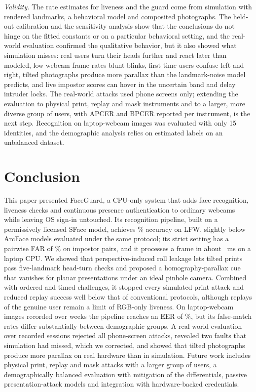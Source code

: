 \documentclass[journal]{IEEEtran}
\newcommand{\sys}{FaceGuard}
\begin{document}
\emph{Validity.} The rate estimates for liveness and the guard come from simulation with rendered landmarks, a behavioral model and composited photographs. The held-out calibration and the sensitivity analysis show that the conclusions do not hinge on the fitted constants or on a particular behavioral setting, and the real-world evaluation confirmed the qualitative behavior, but it also showed what simulation misses: real users turn their heads further and react later than modeled, low webcam frame rates blunt blinks, first-time users confuse left and right, tilted photographs produce more parallax than the landmark-noise model predicts, and live impostor scores can hover in the uncertain band and delay intruder locks. The real-world attacks used phone screens only; extending the evaluation to physical print, replay and mask instruments and to a larger, more diverse group of users, with APCER and BPCER reported per instrument, is the next step. Recognition on laptop-webcam images was evaluated with only 15 identities, and the demographic analysis relies on estimated labels on an unbalanced dataset.

\section{Conclusion}\label{sec:conclusion}
This paper presented \sys{}, a CPU-only system that adds face recognition, liveness checks and continuous presence authentication to ordinary webcams while leaving OS sign-in untouched. Its recognition pipeline, built on a permissively licensed SFace model, achieves \lfwAccFull\% accuracy on LFW, slightly below ArcFace models evaluated under the same protocol; its strict setting has a pairwise FAR of \farStrict\% on \opImpostor{} impostor pairs, and it processes a frame in about \rtPipe~ms on a laptop CPU. We showed that perspective-induced roll leakage lets tilted prints pass five-landmark head-turn checks and proposed a homography-parallax cue that vanishes for planar presentations under an ideal pinhole camera. Combined with ordered and timed challenges, it stopped every simulated print attack and reduced replay success well below that of conventional protocols, although replays of the genuine user remain a limit of RGB-only liveness. On laptop-webcam images recorded over weeks the pipeline reaches an EER of \mpEer\%, but its false-match rates differ substantially between demographic groups. A real-world evaluation over \rwAllSessions{} recorded sessions rejected all \rwAllAttN{} phone-screen attacks, revealed two faults that simulation had missed, which we corrected, and showed that tilted photographs produce more parallax on real hardware than in simulation. Future work includes physical print, replay and mask attacks with a larger group of users, a demographically balanced evaluation with mitigation of the differentials, passive presentation-attack models and integration with hardware-backed credentials.
\end{document}
